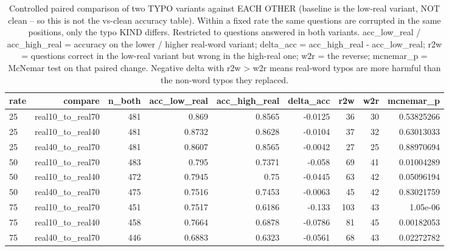 \documentclass[11pt]{article}
\begin{document}
\begin{table}[H]
\centering
\caption{Controlled paired comparison of two TYPO variants against EACH OTHER (baseline is the low-real variant, NOT clean -- so this is not the vs-clean accuracy table). Within a fixed rate the same questions are corrupted in the same positions, only the typo KIND differs. Restricted to questions answered in both variants. acc\_low\_real / acc\_high\_real = accuracy on the lower / higher real-word variant; delta\_acc = acc\_high\_real - acc\_low\_real; r2w = questions correct in the low-real variant but wrong in the high-real one; w2r = the reverse; mcnemar\_p = McNemar test on that paired change. Negative delta with r2w > w2r means real-word typos are more harmful than the non-word typos they replaced.}
\small
\begin{adjustbox}{max width=\textwidth}
\begin{tabular}{lrrrrrrrr}
\toprule
\textbf{rate} & \textbf{compare} & \textbf{n\_both} & \textbf{acc\_low\_real} & \textbf{acc\_high\_real} & \textbf{delta\_acc} & \textbf{r2w} & \textbf{w2r} & \textbf{mcnemar\_p} \\
\midrule
25 & real10\_to\_real70 & 481 & 0.869 & 0.8565 & -0.0125 & 36 & 30 & 0.53825266 \\
25 & real10\_to\_real40 & 481 & 0.8732 & 0.8628 & -0.0104 & 37 & 32 & 0.63013033 \\
25 & real40\_to\_real70 & 481 & 0.8607 & 0.8565 & -0.0042 & 27 & 25 & 0.88970694 \\
50 & real10\_to\_real70 & 483 & 0.795 & 0.7371 & -0.058 & 69 & 41 & 0.01004289 \\
50 & real10\_to\_real40 & 472 & 0.7945 & 0.75 & -0.0445 & 63 & 42 & 0.05096194 \\
50 & real40\_to\_real70 & 475 & 0.7516 & 0.7453 & -0.0063 & 45 & 42 & 0.83021759 \\
75 & real10\_to\_real70 & 451 & 0.7517 & 0.6186 & -0.133 & 103 & 43 & 1.05e-06 \\
75 & real10\_to\_real40 & 458 & 0.7664 & 0.6878 & -0.0786 & 81 & 45 & 0.00182053 \\
75 & real40\_to\_real70 & 446 & 0.6883 & 0.6323 & -0.0561 & 68 & 43 & 0.02272782 \\
\bottomrule
\end{tabular}
\end{adjustbox}
\end{table}
\end{document}
